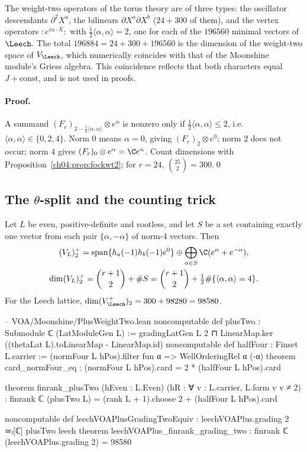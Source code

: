 \begin{physics}
The weight-two operators of the torus theory are of three types: the oscillator descendants $\partial^2X^a$, the bilinears $\partial X^a\partial X^b$ ($24+300$ of them), and the vertex operators $:\!e^{i\alpha\cdot X}\!:$ with $\tfrac12\langle\alpha,\alpha\rangle=2$, one for each of the $196560$ minimal vectors of $\Leech$. The total $196884=24+300+196560$ is the dimension of the weight-two space of $V_\Leech$, which numerically coincides with that of the Moonshine module's Griess algebra. This coincidence reflects that both characters equal $J+\text{const}$, and is not used in proofs.
\end{physics}

\paragraph{Proof.} A summand $(F_r)_{2-\frac12\langle\alpha,\alpha\rangle}\otimes e^\alpha$ is nonzero only if
$\tfrac12\langle\alpha,\alpha\rangle\le2$, i.e.\ $\langle\alpha,\alpha\rangle\in\{0,2,4\}$. Norm $0$ means
$\alpha=0$, giving $(F_r)_2\otimes e^0$; norm $2$ does not occur; norm $4$ gives
$(F_r)_0\otimes e^\alpha=\C e^\alpha$. Count dimensions with Proposition~\ref{ch04:prop:fockwt2}; for
$r=24$, $\binom{25}{2}=300$.\qed

\subsection{The \texorpdfstring{$\theta$}{theta}-split and the counting trick}

\begin{theorem}\label{ch04:thm:plustwo}
Let $L$ be even, positive-definite and rootless, and let $S$ be a set containing exactly one
vector from each pair $\{\alpha,-\alpha\}$ of norm-$4$ vectors. Then
\begin{gather*}
  (V_L)_2^{+}=\operatorname{span}\{h_a(-1)h_b(-1)e^0\}\oplus\bigoplus_{\alpha\in S}\C(e^\alpha+e^{-\alpha}),
  \\
  \dim(V_L)_2^+=\binom{r+1}{2}+\#S=\binom{r+1}{2}+\tfrac12\#\{\langle\alpha,\alpha\rangle=4\}.
\end{gather*}
For the Leech lattice, $\dim(V_\Leech^+)_2=300+98280=98580$.
\end{theorem}

\begin{leancode}
-- VOA/Moonshine/PlusWeightTwo.lean
noncomputable def plusTwo : Submodule ℂ (LatModuleGen L) :=
  gradingLatGen L 2 ⊓ LinearMap.ker ((thetaLat L).toLinearMap - LinearMap.id)
noncomputable def halfFour : Finset L.carrier :=
  (normFour L hPos).filter fun α => WellOrderingRel α (-α)
theorem card_normFour_eq : (normFour L hPos).card = 2 * (halfFour L hPos).card

theorem finrank_plusTwo (hEven : L.Even) (hR : ∀ v : L.carrier, L.form v v ≠ 2) :
    finrank ℂ (plusTwo L) = (rank L + 1).choose 2 + (halfFour L hPos).card

noncomputable def leechVOAPlusGradingTwoEquiv : leechVOAPlus.grading 2 ≃ₗ[ℂ] plusTwo leech
theorem leechVOAPlus_finrank_grading_two : finrank ℂ (leechVOAPlus.grading 2) = 98580
\end{leancode}


